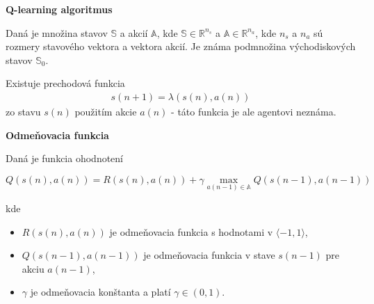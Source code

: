 \documentclass[xcolor=dvipsnames]{beamer}
\begin{document}
\begin{frame}{\bf Q-learning algoritmus}

Daná je množina stavov $\mathbb{S}$ a akcií $\mathbb{A}$, kde
 $\mathbb{S} \in \mathbb{R}^{n_s}$ a $\mathbb{A} \in \mathbb{R}^{n_a}$, kde
$n_s$ a  $n_a$ sú rozmery stavového vektora a vektora akcií. Je známa podmnožina východiskových
stavov $\mathbb{S}_0$.

Existuje prechodová funkcia
\begin{align}
        s(n+1) = \lambda(s(n), a(n))
\end{align}
zo stavu $s(n)$ použitím akcie $a(n)$ - táto funkcia je ale agentovi neznáma.







\end{frame}



\begin{frame}{\bf Odmeňovacia funkcia}

Daná je funkcia ohodnotení

\begin{equation}
Q(s(n),a(n)) = R(s(n),a(n)) + \gamma \max_{a(n-1) \in \mathbb{A}} Q(s(n-1), a(n-1)) \nonumber
\end{equation}

kde \\

\begin{itemize}
 \item $R(s(n),a(n))$ je odmeňovacia funkcia s hodnotami v $\langle -1, 1 \rangle$, \\
 \item $Q(s(n-1),a(n-1))$ je odmeňovacia funkcia v stave $s(n-1)$ pre akciu $a(n-1)$, \\
 \item $\gamma$ je odmeňovacia konštanta a platí $\gamma \in (0, 1)$.
\end{itemize}

\end{frame}
\end{document}
